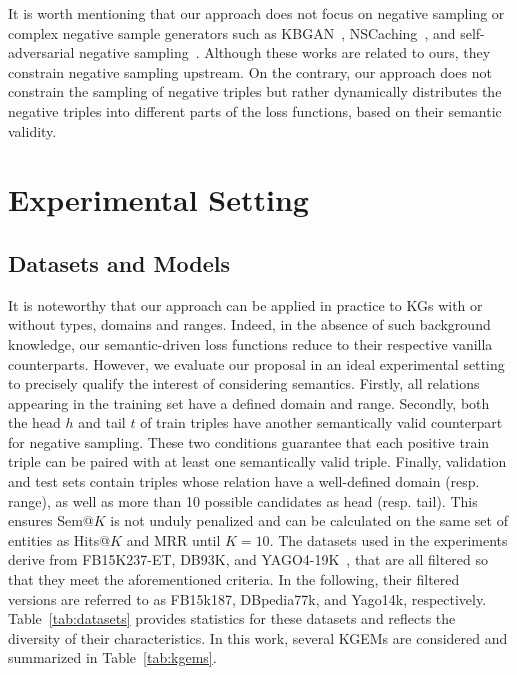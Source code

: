 \documentclass[letterpaper]{article} %
\begin{document}
It is worth mentioning that our approach does not focus on negative sampling or complex negative sample generators such as KBGAN~\cite{kbgan}, NSCaching~\cite{nscaching}, and self-adversarial negative sampling~\cite{rotate}. Although these works are related to ours, they constrain negative sampling upstream.
On the contrary, our approach does not constrain the sampling of negative triples but rather dynamically distributes the negative triples into different parts of the loss functions, based on their semantic validity.

\section{Experimental Setting}\label{experimental-setting}
\subsection{Datasets and Models}\label{datasets}

It is noteworthy that our approach can be applied in practice to KGs with or without types, domains and ranges.
Indeed, in the absence of such background knowledge, our semantic-driven loss functions reduce to their respective vanilla counterparts.
However, we evaluate our proposal in an ideal experimental setting to precisely qualify the interest of considering semantics.
Firstly, all relations appearing in the training set have a defined domain and range. Secondly, both  the head $h$ and tail $t$ of train triples have another semantically valid counterpart for negative sampling. These two conditions guarantee that each positive train triple can be paired with at least one semantically valid triple. Finally, validation and test sets contain triples whose relation have a well-defined domain (resp. range), as well as more than 10 possible candidates as head (resp. tail). This ensures Sem@$K$ is not unduly penalized and can be calculated on the same set of entities as Hits@$K$ and MRR until $K=10$.
The datasets used in the experiments derive from FB15K237-ET, DB93K, and YAGO4-19K~\cite{hubert2023}, that are all filtered so that they meet the aforementioned criteria.
In the following, their filtered versions are referred to as FB15k187, DBpedia77k, and Yago14k, respectively.
Table~\ref{tab:datasets} provides statistics for these datasets and reflects the diversity of their characteristics. In this work, several KGEMs are considered and summarized in Table~\ref{tab:kgems}.
\end{document}
